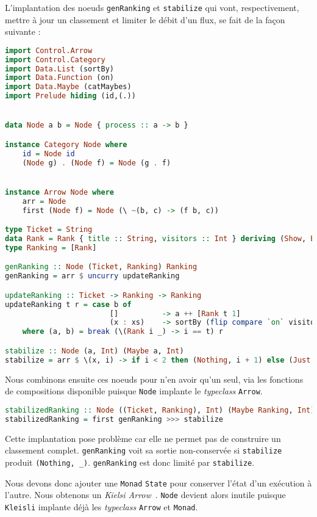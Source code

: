 \documentclass{llncs}
\newcommand{\Arr}{\texttt{Arrow} }
\newcommand{\Arrp}{\texttt{Arrow}. }
\begin{document}
L'implantation des noeuds \texttt{genRanking} et \texttt{stabilize} qui vont,
respectivement, mettre à jour un classement et limiter le débit d'un flux,
se fait de la façon suivante :
\begin{lstlisting}[language=haskell]
import Control.Arrow
import Control.Category
import Data.List (sortBy)
import Data.Function (on)
import Data.Maybe (catMaybes)
import Prelude hiding (id,(.))


data Node a b = Node { process :: a -> b }

instance Category Node where
    id = Node id
    (Node g) . (Node f) = Node (g . f)


instance Arrow Node where
    arr = Node
    first (Node f) = Node (\ ~(b, c) -> (f b, c))

type Ticket = String
data Rank = Rank { title :: String, visitors :: Int } deriving (Show, Eq)
type Ranking = [Rank]

genRanking :: Node (Ticket, Ranking) Ranking
genRanking = arr $ uncurry updateRanking

updateRanking :: Ticket -> Ranking -> Ranking
updateRanking t r = case b of
                        []          -> a ++ [Rank t 1]
                        (x : xs)    -> sortBy (flip compare `on` visitors) (Rank t (1 + visitors x) : a ++ xs)
    where (a, b) = break (\(Rank i _) -> i == t) r

stabilize :: Node (a, Int) (Maybe a, Int)
stabilize = arr $ \(x, i) -> if i < 2 then (Nothing, i + 1) else (Just x, 0)
\end{lstlisting}

Nous combinons ensuite ces noeuds pour n'en avoir qu'un seul, via les fonctions
de compositions disponible puisque \texttt{Node} implante le \emph{typeclass} \Arrp
\begin{lstlisting}[language=haskell]
stabilizedRanking :: Node ((Ticket, Ranking), Int) (Maybe Ranking, Int)
stabilizedRanking = first genRanking >>> stabilize
\end{lstlisting}

Cette implantation pose problème car elle ne permet pas de construire un classement
complet. \texttt{genRanking} voit sa sortie non-conservée si \texttt{stabilize}
produit \texttt{(Nothing, \_)}.
\texttt{genRanking} est donc limité par \texttt{stabilize}.

Nous devons donc ajouter une \texttt{Monad} \texttt{State} pour conserver l'état d'un exécution à l'autre.
Nous obtenons un \emph{Kielsi Arrow}~\cite{Hughes00}.
\texttt{Node} devient alors inutile puisque \texttt{Kleisli} implante déjà les
\emph{typeclass} \Arr et \texttt{Monad}.
\end{document}
